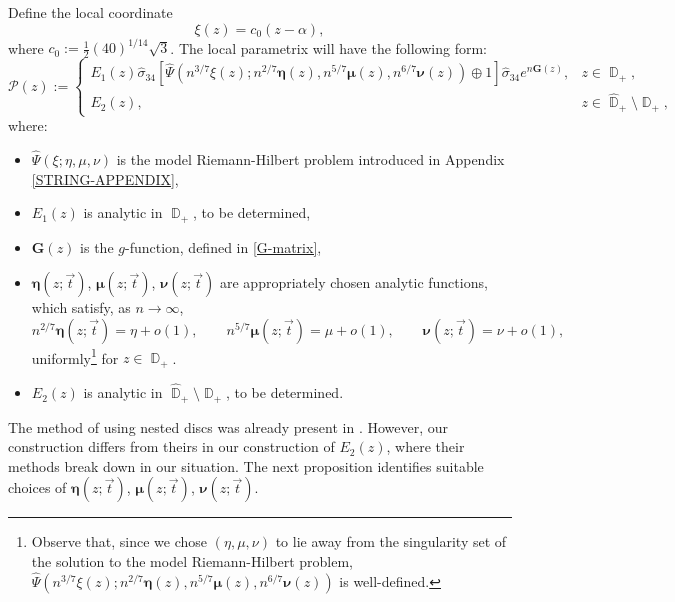 \documentclass[usenames,dvipsnames]{article}
\theoremstyle{definition}
\DeclareMathOperator{\DD}{\mathbb{D}}
\numberwithin{equation}{section}
\numberwithin{figure}{section}
\begin{document}
Define the local coordinate
    \begin{equation}
        \xi(z) = c_0(z-\alpha),
    \end{equation}
where $c_0 := \frac{1}{2}(40)^{1/14}\sqrt{3}$. The local parametrix will have the following form:
    \begin{equation}
        \mathcal{P}(z) := 
        \begin{cases}
            E_1(z)\hat{\sigma}_{34}\left[\hat{\Psi}(n^{3/7}\xi(z);n^{2/7}\boldsymbol{\eta}(z),n^{5/7}\boldsymbol{\mu}(z),n^{6/7}\boldsymbol{\nu}(z)) \oplus 1\right]\hat{\sigma}_{34}e^{n\boldsymbol{G}(z)}, & z\in \DD_+,\\
            E_2(z), & z\in \hat{\DD}_+\setminus\DD_+,
        \end{cases}
    \end{equation}
where:
    \begin{itemize}
        \item $\hat{\Psi}(\xi;\eta,\mu,\nu)$ is the model Riemann-Hilbert problem introduced in Appendix \ref{STRING-APPENDIX},
        \item $E_1(z)$ is analytic in $\DD_+$, to be determined,
        \item $\boldsymbol{G}(z)$ is the $g$-function, defined in \eqref{G-matrix},
        \item $\boldsymbol{\eta}(z;\vec{t})$, $\boldsymbol{\mu}(z;\vec{t})$, $\boldsymbol{\nu}(z;\vec{t})$ are appropriately chosen analytic functions, which satisfy, as $n\to \infty$,
            \begin{equation}\label{eta-mu-nu-limits}
                n^{2/7}\boldsymbol{\eta}(z;\vec{t})  = \eta + o(1),\qquad n^{5/7}\boldsymbol{\mu}(z;\vec{t}) = \mu + o(1),\qquad \boldsymbol{\nu}(z;\vec{t})  = \nu + o(1),
            \end{equation}
        uniformly\footnote{Observe that, since we chose $(\eta,\mu,\nu)$ to lie away from the singularity set of the solution to the model Riemann-Hilbert problem, $\hat{\Psi}(n^{3/7}\xi(z);n^{2/7}\boldsymbol{\eta}(z),n^{5/7}\boldsymbol{\mu}(z),n^{6/7}\boldsymbol{\nu}(z))$ is well-defined.} for $z\in \DD_+$. 
        \item $E_2(z)$ is analytic in $\hat{\DD}_+\setminus \DD_+$, to be determined.
    \end{itemize}
The method of using nested discs was already present in \cite{Molag0,Molag}. However, our construction differs from theirs in our construction of $E_2(z)$, where their methods break down in our situation.
The next proposition identifies suitable choices of $\boldsymbol{\eta}(z;\vec{t})$, $\boldsymbol{\mu}(z;\vec{t})$, $\boldsymbol{\nu}(z;\vec{t})$.
\end{document}
